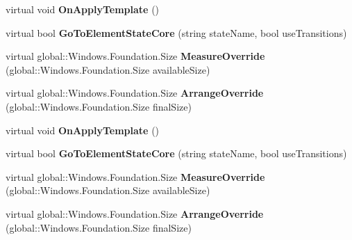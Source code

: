 \begin{DoxyCompactItemize}
virtual void {\bfseries On\+Apply\+Template} ()
\item 
\mbox{\label{class_windows_1_1_u_i_1_1_xaml_1_1_framework_element_ab28bfbcd2ce35b9f1d361c4b523e169b}} 
virtual bool {\bfseries Go\+To\+Element\+State\+Core} (string state\+Name, bool use\+Transitions)
\item 
\mbox{\label{class_windows_1_1_u_i_1_1_xaml_1_1_framework_element_af7bed5025864082e11a8690534124dd6}} 
virtual global\+::\+Windows.\+Foundation.\+Size {\bfseries Measure\+Override} (global\+::\+Windows.\+Foundation.\+Size available\+Size)
\item 
\mbox{\label{class_windows_1_1_u_i_1_1_xaml_1_1_framework_element_ae01b5ef9f4d89b138b02e23be40b1a6d}} 
virtual global\+::\+Windows.\+Foundation.\+Size {\bfseries Arrange\+Override} (global\+::\+Windows.\+Foundation.\+Size final\+Size)
\item 
\mbox{\label{class_windows_1_1_u_i_1_1_xaml_1_1_framework_element_a176a704e93c067d7a68890b4560a974a}} 
virtual void {\bfseries On\+Apply\+Template} ()
\item 
\mbox{\label{class_windows_1_1_u_i_1_1_xaml_1_1_framework_element_ab28bfbcd2ce35b9f1d361c4b523e169b}} 
virtual bool {\bfseries Go\+To\+Element\+State\+Core} (string state\+Name, bool use\+Transitions)
\item 
\mbox{\label{class_windows_1_1_u_i_1_1_xaml_1_1_framework_element_af7bed5025864082e11a8690534124dd6}} 
virtual global\+::\+Windows.\+Foundation.\+Size {\bfseries Measure\+Override} (global\+::\+Windows.\+Foundation.\+Size available\+Size)
\item 
\mbox{\label{class_windows_1_1_u_i_1_1_xaml_1_1_framework_element_ae01b5ef9f4d89b138b02e23be40b1a6d}} 
virtual global\+::\+Windows.\+Foundation.\+Size {\bfseries Arrange\+Override} (global\+::\+Windows.\+Foundation.\+Size final\+Size)
\item 

\end{DoxyCompactItemize}
